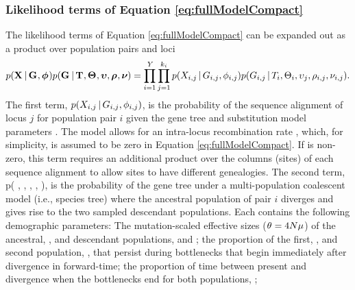 \subsubsection*{Likelihood terms of Equation \ref{eq:fullModelCompact}}
\begin{linenomath}
The likelihood terms of Equation \ref{eq:fullModelCompact} can
be expanded out as a product over population pairs and loci
\begin{equation}
    p(\alignmentVector \given \geneTreeVector, \hkyModelVector)
    p(\geneTreeVector \given \divTimeMapVector, \demographicParamVector,
    \locusMutationRateScalarVector, \ploidyScalarVector,
    \mutationRateScalarConstantVector) = 
    \prod_{i=1}^{\npairs{}}
    \prod_{j=1}^{\nloci{i}}
    p(\alignment{i}{j} \given \geneTree{i}{j}, \hkyModel{i}{j})
    p(\geneTree{i}{j} \given \divTimeMap{i}, \demographicParams{i},
    \locusMutationRateScalar{j}, \ploidyScalar{i}{j},
    \mutationRateScalarConstant{i}{j}).
    \label{eq:modelLikelihoodExpanded}
\end{equation}
The first term,
$p(\alignment{i}{j} \given \geneTree{i}{j}, \hkyModel{i}{j})$,
is the probability of the sequence alignment of locus $j$ for population pair
$i$ given the gene tree and \hky substitution model parameters \citep[i.e., the
``Felsenstein likelihood'';][]{Felsenstein1981}.
The model allows for an intra-locus recombination rate \recombinationRate,
which, for simplicity, is assumed to be zero in Equation
\ref{eq:fullModelCompact}.
If \recombinationRate is non-zero, this term requires an additional product
over the columns (sites) of each sequence alignment to allow sites to have
different genealogies.
The second term,
p( \given {}, ,
, ,
),
is the probability of the gene tree under a multi-population coalescent model
(i.e., species tree) where the ancestral population of pair $i$ diverges
and gives rise to the two sampled descendant populations.
Each \demographicParams{} contains the following demographic parameters: The
mutation-scaled effective sizes ($\theta_{} = 4N\mu$) of the
ancestral, \ancestralTheta{}, and descendant populations, 
and ;
the proportion of the first, , and second population,
, that persist during bottlenecks that begin immediately
after divergence in forward-time;
the proportion of time between present and divergence when the bottlenecks
end for both populations, \bottleTime{};

\end{linenomath}
